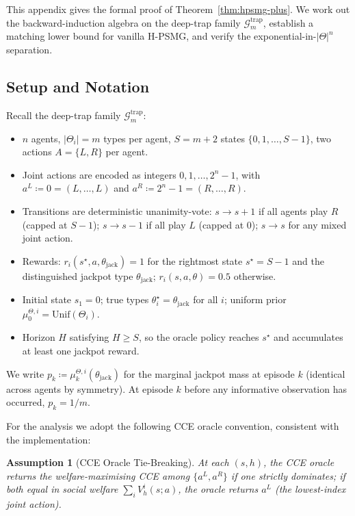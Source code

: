 \documentclass{article}
\newtheorem{assumption}[theorem]{Assumption}
\begin{document}
This appendix gives the formal proof of Theorem~\ref{thm:hpsmg-plus}. We work out the backward-induction algebra on the deep-trap family $\mathcal{G}_m^{\mathrm{trap}}$, establish a matching lower bound for vanilla H-PSMG, and verify the exponential-in-$|\Theta|^n$ separation.

\subsection{Setup and Notation}
\label{app:hpsmg-plus-setup}

Recall the deep-trap family $\mathcal{G}_m^{\mathrm{trap}}$:
\begin{itemize}
\item $n$ agents, $|\Theta_i| = m$ types per agent, $S = m+2$ states $\{0, 1, \ldots, S-1\}$, two actions $A = \{L, R\}$ per agent.
\item Joint actions are encoded as integers $0, 1, \ldots, 2^n - 1$, with $a^L \coloneqq 0 = (L, \ldots, L)$ and $a^R \coloneqq 2^n - 1 = (R, \ldots, R)$.
\item Transitions are deterministic unanimity-vote: $s \to s+1$ if all agents play $R$ (capped at $S-1$); $s \to s-1$ if all play $L$ (capped at $0$); $s \to s$ for any mixed joint action.
\item Rewards: $r_i(s^\star, a, \theta_{\mathrm{jack}}) = 1$ for the rightmost state $s^\star = S-1$ and the distinguished jackpot type $\theta_{\mathrm{jack}}$; $r_i(s, a, \theta) = 0.5$ otherwise.
\item Initial state $s_1 = 0$; true types $\theta_i^\star = \theta_{\mathrm{jack}}$ for all $i$; uniform prior $\mu_0^{\Theta, i} = \mathrm{Unif}(\Theta_i)$.
\item Horizon $H$ satisfying $H \geq S$, so the oracle policy reaches $s^\star$ and accumulates at least one jackpot reward.
\end{itemize}

We write $p_k \coloneqq \mu_k^{\Theta, i}(\theta_{\mathrm{jack}})$ for the marginal jackpot mass at episode $k$ (identical across agents by symmetry). At episode $k$ before any informative observation has occurred, $p_k = 1/m$.

For the analysis we adopt the following CCE oracle convention, consistent with the implementation:

\begin{assumption}[CCE Oracle Tie-Breaking]
\label{ass:cce-tiebreak}
At each $(s, h)$, the CCE oracle returns the welfare-maximising CCE among $\{a^L, a^R\}$ if one strictly dominates; if both equal in social welfare $\sum_i V_h^i(s; a)$, the oracle returns $a^L$ (the lowest-index joint action).
\end{assumption}
\end{document}
